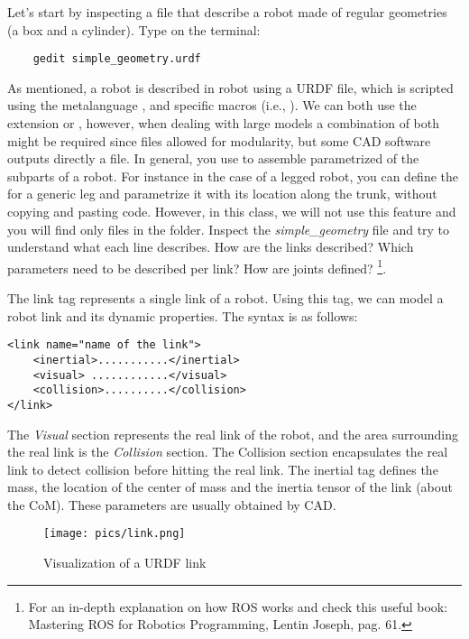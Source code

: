 \documentclass[11pt]{article}
\begin{document}
Let's start by inspecting a file that describe a robot made of regular geometries (a box and a cylinder). Type on the terminal:

\begin{verbatim}
	gedit simple_geometry.urdf
\end{verbatim}

As mentioned, a robot is described in robot using a URDF file, which is scripted using the metalanguage , and specific  macros (i.e., ). We can both use the extension  or , however, when dealing with large models a combination of both might be required since  files allowed for modularity, but some CAD software outputs directly a  file. In general, you use   to assemble  parametrized   of the subparts of a robot. For instance in the case of a legged robot, you can define the   for a generic leg and parametrize it with its location along the trunk, without copying and pasting code. However, in this class, we will not use this feature and you will find only  files in the folder. 
Inspect the \textit{simple\_geometry} file and try to understand what each line describes. How are the links described? Which parameters need to be described per link? How are joints defined? \footnote{For an in-depth explanation on how ROS works and check this useful book: Mastering ROS for Robotics	Programming, Lentin Joseph, pag. 61.}. 

The link tag represents a single link of a robot. Using this tag, we
can model a robot link and its dynamic properties. The syntax is as follows:
	
\begin{Verbatim}	
<link name="name of the link">
	<inertial>...........</inertial>
	<visual> ............</visual>
	<collision>..........</collision>
</link>
\end{Verbatim}

The \textit{Visual} section represents the real link of the robot, and the area surrounding the real link
is the \textit{Collision} section. The Collision section encapsulates the real link to
detect collision before hitting the real link. The inertial tag defines the mass, the location of the center of mass and the inertia tensor of the link (about the CoM). These parameters are usually obtained by CAD.

\begin{figure}[H]
	\centering
	\texttt{[image: pics/link.png]}
	\caption{Visualization of a URDF link}
	\label{fig:link}
\end{figure}
\end{document}
